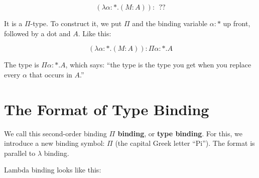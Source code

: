 \documentclass{book}
\numberwithin{equation}{chapter}
\newcommand{\vocab}{\textbf}
\begin{document}
\begin{equation}
(\lambda \alpha : *.(M : A)) :~~??
\end{equation}

\noindent
It is a $\Pi$-type. To construct it, we put $\Pi$ and the binding variable $\alpha : *$ up front, followed by a dot and $A$. Like this:

\begin{equation}
(\lambda \alpha : *.(M : A)) : \Pi \alpha : *.A
\end{equation}

\noindent
The type is $\Pi \alpha : *.A$, which says: ``the type is the type you get when you replace every $\alpha$ that occurs in $A$.''


\section{The Format of Type Binding}

We call this second-order binding \vocab{$\Pi$ binding}, or \vocab{type binding}. For this, we introduce a new binding symbol: $\Pi$ (the capital Greek letter ``Pi''). The format is parallel to $\lambda$ binding.

Lambda binding looks like this:
\end{document}

